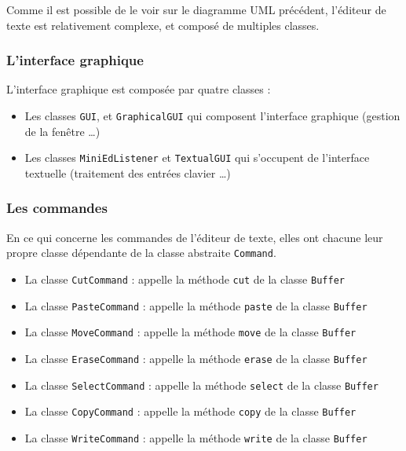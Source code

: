\documentclass[a4paper]{article}
\begin{document}
		\vspace{0.5cm}

		Comme il est possible de le voir sur le diagramme UML précédent, l'éditeur de texte est relativement complexe, et composé de multiples classes. 

		\vspace{0.5cm}

			\subsubsection{L'interface graphique}

			L'interface graphique est composée par quatre classes :

			\begin{itemize}
				\item Les classes \texttt{GUI}, et \texttt{GraphicalGUI} qui composent l'interface graphique (gestion de la fenêtre \dots)

				\item Les classes \texttt{MiniEdListener} et \texttt{TextualGUI} qui s'occupent de l'interface textuelle (traitement des entrées clavier \dots)
			\end{itemize}

			\subsubsection{Les commandes}

			En ce qui concerne les commandes de l'éditeur de texte, elles ont chacune leur propre classe dépendante de la classe abstraite \texttt{Command}.

			\begin{itemize}
				\item La classe \texttt{CutCommand} : appelle la méthode \texttt{cut} de la classe \texttt{Buffer}

				\item La classe \texttt{PasteCommand} : appelle la méthode \texttt{paste} de la classe \texttt{Buffer}

				\item La classe \texttt{MoveCommand} : appelle la méthode \texttt{move} de la classe \texttt{Buffer}

				\item La classe \texttt{EraseCommand} : appelle la méthode \texttt{erase} de la classe \texttt{Buffer}

				\item La classe \texttt{SelectCommand} : appelle la méthode \texttt{select} de la classe \texttt{Buffer}

				\item La classe \texttt{CopyCommand} : appelle la méthode \texttt{copy} de la classe \texttt{Buffer}

				\item La classe \texttt{WriteCommand} : appelle la méthode \texttt{write} de la classe \texttt{Buffer}
			\end{itemize}
\end{document}
